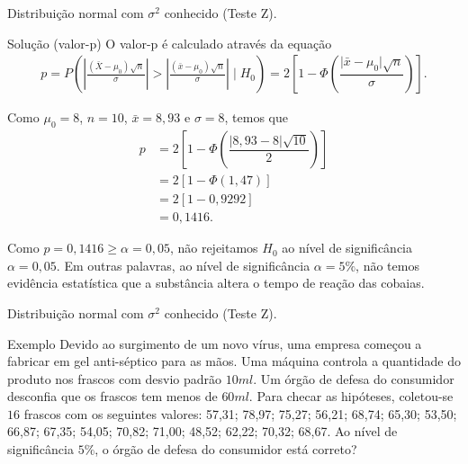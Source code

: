 \documentclass[8pt]{beamer}
\begin{document}
\begin{frame}{Distribuição normal com $\sigma^2$ conhecido (Teste Z).}

\begin{block}{Solução (valor-p)}
	O valor-p é calculado através da equação
	\begin{align*}
	p= P\left(\left\lvert \frac{(\bar{X} - \mu_0)\sqrt{n}}{\sigma} \right\rvert > \left\lvert \frac{(\bar{x} - \mu_0)\sqrt{n}}{\sigma} \right\rvert \mid H_0\right) =2\left[ 1-\Phi\left( \dfrac{\lvert \bar{x} - \mu_0 \rvert \sqrt{n}}{\sigma} \right)\right].
	\end{align*}
	\vfill
	
	Como $\mu_0 = 8$, $n=10$, $\bar{x}=8,93$ e $\sigma=8$, temos que 
	\begin{align*}
	p &= 2\left[ 1- \Phi\left(  \dfrac{\lvert 8,93 - 8 \rvert \sqrt{10}}{2} \right) \right]\\
	&= 2 \left[ 1- \Phi(1,47) \right]\\
	&= 2 [ 1- 0,9292] \\
	&= 0,1416.
	\end{align*}
	
	Como $p=0,1416 \geq \alpha= 0,05$, não rejeitamos $H_0$ ao nível de significância $\alpha = 0,05$. Em outras palavras, ao nível de significância $\alpha = 5\%$, não temos evidência estatística que a substância altera o tempo de reação das cobaias.
		
\end{block}

\end{frame}

\begin{frame}{Distribuição normal com $\sigma^2$ conhecido (Teste Z).}

\large

\begin{block}{Exemplo}
	Devido ao surgimento de um novo vírus, uma empresa começou a fabricar em gel anti-séptico para as mãos. Uma máquina  controla a quantidade do produto nos frascos com desvio padrão $10ml$.
	Um órgão de defesa do consumidor desconfia que os frascos tem menos de $60ml$.
	Para checar as hipóteses, coletou-se $16$ frascos com os seguintes valores: 57,31; 78,97; 75,27; 56,21; 68,74; 65,30; 53,50; 66,87; 67,35; 54,05; 70,82; 71,00;
	48,52; 62,22; 70,32; 68,67. Ao nível de significância $5\%$, o órgão de defesa do consumidor está correto?
\end{block}
\normalsize

\end{frame}
\end{document}
